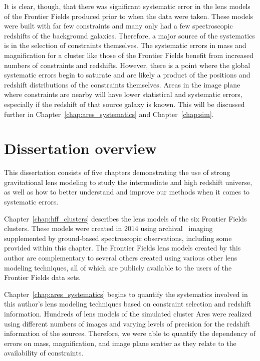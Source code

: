 It is clear, though, that there was significant systematic error in the lens models of the Frontier Fields produced prior to when the data were taken. These models were built with far few constraints and many only had a few spectroscopic redshifts of the background galaxies. Therefore, a major source of the systematics is in the selection of constraints themselves. The systematic errors in mass and magnification for a cluster like those of the Frontier Fields benefit from increased numbers of constraints and redshifts. However, there is a point where the global systematic errors begin to saturate and are likely a product of the positions and redshift distributions of the constraints themselves. Areas in the image plane where constraints are nearby will have lower statistical and systematic errors, especially if the redshift of that source galaxy is known. This will be discussed further in Chapter~\ref{chap:ares_systematics} and Chapter~\ref{chap:sim}.

\section{Dissertation overview}

This dissertation consists of five chapters demonstrating the use of strong gravitational lens modeling to study the intermediate and high redshift universe, as well as how to better understand and improve our methods when it comes to systematic errors.

Chapter~\ref{chap:hff_clusters} describes the lens models of the six Frontier Fields clusters. These models were created in 2014 using archival \hst\ imaging supplemented by ground-based spectroscopic observations, including some provided within this chapter. The Frontier Fields lens models created by this author are complementary to several others created using various other lens modeling techniques, all of which are publicly available to the users of the Frontier Fields data sets.

Chapter~\ref{chap:ares_systematics} begins to quantify the systematics involved in this author's lens modeling techniques based on constraint selection and redshift information. Hundreds of lens models of the simulated cluster Ares were realized using different numbers of images and varying levels of precision for the redshift information of the sources. Therefore, we were able to quantify the dependency of errors on mass, magnification, and image plane scatter as they relate to the availability of constraints.

